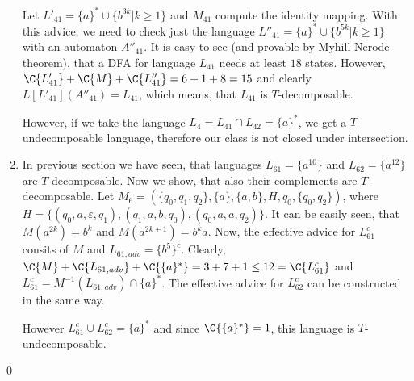 \begin{enumerate}
Let $L'_{41} = \{ a\}^* \cup \{ b^{3k} | k \geq 1 \}$ and $M_{41}$ compute the identity mapping. With this advice, we need to check just the language $L''_{41} = \{ a\}^* \cup \{ b^{5k} | k \geq 1 \}$ with an automaton $A''_{41}$. It is easy to see (and provable by Myhill-Nerode theorem), that a DFA for language $L_{41}$ needs at least $18$ states. However, $\C{L'_{41}} + \C{M} + \C{L''_{41}} = 6 + 1 + 8 = 15$ and clearly $L[L'_{41}](A''_{41}) = L_{41}$, which means, that $L_{41}$ is $T$-decomposable.

However, if we take the language $L_4 = L_{41} \cap L_{42} = \{ a\}^*$, we get a $T$-undecomposable language, therefore our class is not closed under intersection.

\item In previous section we have seen, that languages $L_{61} = \{a^{10}\}$ and $L_{62}=\{a^{12}\}$ are $T$-decomposable. Now we show, that also their complements are $T$-decomposable. Let $M_6 =(\{q_0,q_1,q_2\}, \{a\},\{a,b\},H,q_0,\{q_0,q_2\})$, where $H = \{(q_0,a,\varepsilon,q_1),\allowbreak (q_1,a,b,q_0),\allowbreak (q_0,a,a,q_2)\}$. It can be easily seen, that $M(a^{2k}) = b^k$ and $M(a^{2k+1}) = b^ka$. Now, the effective advice for $L_{61}^c$ consits of $M$ and $L_{61,adv} = \{b^5\}^c$. Clearly, $\C{M} + \C{L_{61,adv}} + \C{\{a\}^*} = 3+7+1 \leq 12 = \C{L_{61}^c}$ and $L_{61}^c = M^{-1}(L_{61,adv}) \cap \{a\}^*$. The effective advice for $L_{62}^c$ can be constructed in the same way.

However $L_{61}^c \cup L_{62}^c = \{a\}^*$ and since $\C{\{a\}^*} = 1$, this language is $T$-undecomposable.
\end{enumerate} \qed
